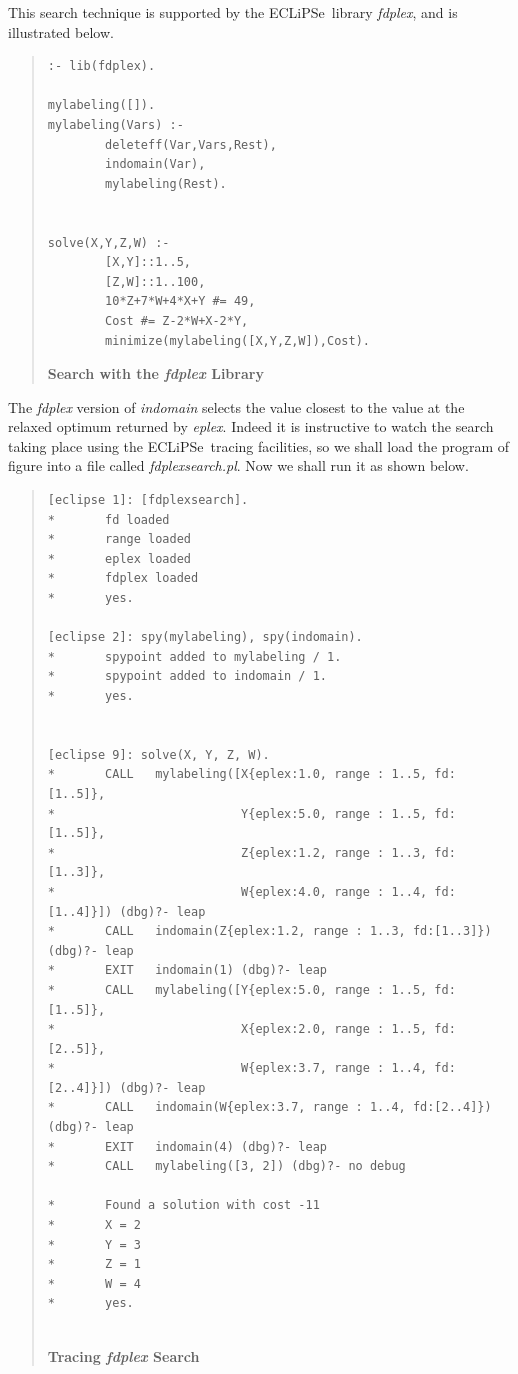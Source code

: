\documentclass[a4wide]{article}
\newcommand{\ECL}{\mbox{ECLiPSe\ }{\hspace{1mm}}}
\begin{document}
This search technique is supported by the \ECL library {\em fdplex},
and is illustrated below.
\begin{quote}
\begin{verbatim}
:- lib(fdplex).

mylabeling([]).
mylabeling(Vars) :-
        deleteff(Var,Vars,Rest),
        indomain(Var),
        mylabeling(Rest).


solve(X,Y,Z,W) :-
        [X,Y]::1..5,
        [Z,W]::1..100,
        10*Z+7*W+4*X+Y #= 49,
        Cost #= Z-2*W+X-2*Y,
        minimize(mylabeling([X,Y,Z,W]),Cost).
\end{verbatim}
{\bf Search with the {\em fdplex} Library}
\label{fdplexsearch}
\end{quote} 
The {\em fdplex} version of {\em indomain} selects the value closest
to the value at the relaxed optimum returned by {\em eplex}.
Indeed it is instructive to watch the search taking place using the
\ECL tracing facilities,
so we shall load the program of figure \pageref{fdplexsearch} into a file
called {\em fdplexsearch.pl}.
Now we shall run it as shown below.
\begin{quote}
\begin{verbatim}
[eclipse 1]: [fdplexsearch].
*       fd loaded 
*       range loaded
*       eplex loaded
*       fdplex loaded
*       yes.

[eclipse 2]: spy(mylabeling), spy(indomain).
*       spypoint added to mylabeling / 1.
*       spypoint added to indomain / 1.
*       yes.


[eclipse 9]: solve(X, Y, Z, W).
*       CALL   mylabeling([X{eplex:1.0, range : 1..5, fd:[1..5]}, 
*                          Y{eplex:5.0, range : 1..5, fd:[1..5]}, 
*                          Z{eplex:1.2, range : 1..3, fd:[1..3]}, 
*                          W{eplex:4.0, range : 1..4, fd:[1..4]}]) (dbg)?- leap
*       CALL   indomain(Z{eplex:1.2, range : 1..3, fd:[1..3]}) (dbg)?- leap
*       EXIT   indomain(1) (dbg)?- leap
*       CALL   mylabeling([Y{eplex:5.0, range : 1..5, fd:[1..5]}, 
*                          X{eplex:2.0, range : 1..5, fd:[2..5]}, 
*                          W{eplex:3.7, range : 1..4, fd:[2..4]}]) (dbg)?- leap
*       CALL   indomain(W{eplex:3.7, range : 1..4, fd:[2..4]}) (dbg)?- leap
*       EXIT   indomain(4) (dbg)?- leap
*       CALL   mylabeling([3, 2]) (dbg)?- no debug

*       Found a solution with cost -11
*       X = 2
*       Y = 3
*       Z = 1
*       W = 4
*       yes.


\end{verbatim}
{\bf Tracing {\em fdplex} Search}
\label{fdplextrace}
\end{quote} 
\end{document}
